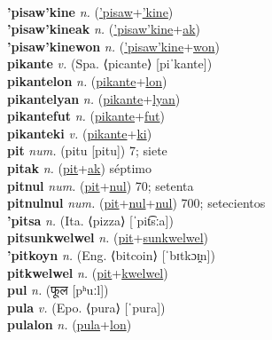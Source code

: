  \label{'pisaw} \\
\textbf{'pisaw'kine} \textit{n.} (\hyperref['pisaw]{'pisaw}+\hyperref['kine]{'kine})
 \label{'pisaw'kine} \\
\textbf{'pisaw'kineak} \textit{n.} (\hyperref['pisaw'kine]{'pisaw'kine}+\hyperref[ak]{ak})
 \label{'pisaw'kineak} \\
\textbf{'pisaw'kinewon} \textit{n.} (\hyperref['pisaw'kine]{'pisaw'kine}+\hyperref[won]{won})
 \label{'pisaw'kinewon} \\
\textbf{pikante} \textit{v.} (Spa. ⟨picante⟩ [piˈkante])
 \label{pikante} \\
\textbf{pikantelon} \textit{n.} (\hyperref[pikante]{pikante}+\hyperref[lon]{lon})
 \label{pikantelon} \\
\textbf{pikantelyan} \textit{n.} (\hyperref[pikante]{pikante}+\hyperref[lyan]{lyan})
 \label{pikantelyan} \\
\textbf{pikantefut} \textit{n.} (\hyperref[pikante]{pikante}+\hyperref[fut]{fut})
 \label{pikantefut} \\
\textbf{pikanteki} \textit{v.} (\hyperref[pikante]{pikante}+\hyperref[ki]{ki})
 \label{pikanteki} \\
\textbf{pit} \textit{num.} ({\javanese{}pitu} [pitu])
7; siete \label{pit} \\
\textbf{pitak} \textit{n.} (\hyperref[pit]{pit}+\hyperref[ak]{ak})
séptimo \label{pitak} \\
\textbf{pitnul} \textit{num.} (\hyperref[pit]{pit}+\hyperref[nul]{nul})
70; setenta \label{pitnul} \\
\textbf{pitnulnul} \textit{num.} (\hyperref[pit]{pit}+\hyperref[nul]{nul}+\hyperref[nul]{nul})
700; setecientos \label{pitnulnul} \\
\textbf{'pitsa} \textit{n.} (Ita. ⟨pizza⟩ [ˈpit͡sːa])
 \label{'pitsa} \\
\textbf{pitsunkwelwel} \textit{n.} (\hyperref[pit]{pit}+\hyperref[sunkwelwel]{sunkwelwel})
 \label{pitsunkwelwel} \\
\textbf{'pitkoyn} \textit{n.} (Eng. ⟨bitcoin⟩ [ˈbɪtkɔɪ̯n])
 \label{'pitkoyn} \\
\textbf{pitkwelwel} \textit{n.} (\hyperref[pit]{pit}+\hyperref[kwelwel]{kwelwel})
 \label{pitkwelwel} \\
\textbf{pul} \textit{n.} ({\devanagari{}फूल} [pʰuːl])
 \label{pul} \\
\textbf{pula} \textit{v.} (Epo. ⟨pura⟩ [ˈpura])
 \label{pula} \\
\textbf{pulalon} \textit{n.} (\hyperref[pula]{pula}+\hyperref[lon]{lon})
